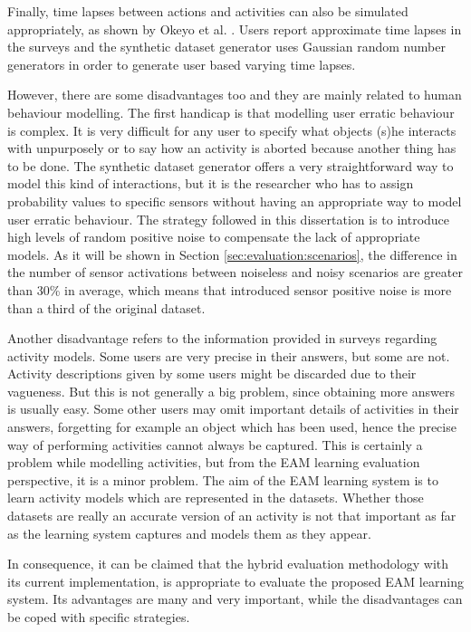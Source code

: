 Finally, time lapses between actions and activities can also be simulated appropriately, as shown by Okeyo et al. \cite{Okeyo2012a}. Users report approximate time lapses in the surveys and the synthetic dataset generator uses Gaussian random number generators in order to generate user based varying time lapses. 

However, there are some disadvantages too and they are mainly related to human behaviour modelling. The first handicap is that modelling user erratic behaviour is complex. It is very difficult for any user to specify what objects (s)he interacts with unpurposely or to say how an activity is aborted because another thing has to be done. The synthetic dataset generator offers a very straightforward way to model this kind of interactions, but it is the researcher who has to assign probability values to specific sensors without having an appropriate way to model user erratic behaviour. The strategy followed in this dissertation is to introduce high levels of random positive noise to compensate the lack of appropriate models. As it will be shown in Section \ref{sec:evaluation:scenarios}, the difference in the number of sensor activations between noiseless and noisy scenarios are greater than 30\% in average, which means that introduced sensor positive noise is more than a third of the original dataset. 

Another disadvantage refers to the information provided in surveys regarding activity models. Some users are very precise in their answers, but some are not. Activity descriptions given by some users might be discarded due to their vagueness. But this is not generally a big problem, since obtaining more answers is usually easy. Some other users may omit important details of activities in their answers, forgetting for example an object which has been used, hence the precise way of performing activities cannot always be captured. This is certainly a problem while modelling activities, but from the EAM learning evaluation perspective, it is a minor problem. The aim of the EAM learning system is to learn activity models which are represented in the datasets. Whether those datasets are really an accurate version of an activity is not that important as far as the learning system captures and models them as they appear.

In consequence, it can be claimed that the hybrid evaluation methodology with its current implementation, is appropriate to evaluate the proposed EAM learning system. Its advantages are many and very important, while the disadvantages can be coped with specific strategies. 

